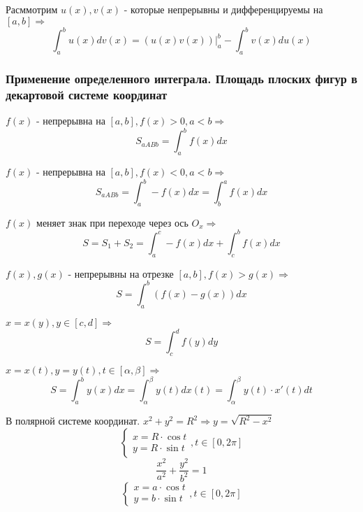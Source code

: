     \begin{theorem}
        Расммотрим $u(x), v(x)$ - которые непрерывны и дифференцируемы на $[a,b] \Rightarrow $ $$\int^b_a u(x)dv(x) = (u(x) v(x))|^b_a - \int^b_a v(x)du(x)$$
    \end{theorem}

    \subsubsection{Применение определенного интеграла. Площадь плоских фигур в декартовой системе координат}


    $f(x)$ - непрерывна на $[a,b], f(x) > 0, a<b \Rightarrow$
    $$S_{aABb} = \int^b_a f(x) dx$$


    $f(x)$ - непрерывна на $[a,b], f(x) < 0, a<b \Rightarrow$
    $$S_{aABb} = \int^b_a -f(x) dx = \int^a_b f(x)dx$$ 

    
    $f(x)$ меняет знак при переходе через ось $O_x \Rightarrow$
    $$S = S_1 + S_2 = \int_a^c - f(x)dx + \int^b_c f(x)dx$$


    $f(x), g(x)$ - непрерывны на отрезке $[a,b], f(x) > g(x) \Rightarrow$
    $$S = \int^b_a (f(x) - g(x))dx$$


    $x = x(y), y\in[c,d] \Rightarrow$
    $$S = \int_c^d f(y)dy$$


    $x=x(t), y=y(t), t\in[\alpha, \beta] \Rightarrow$
    $$S = \int^b_a y(x)dx = \int^{\beta}_{\alpha} y(t)dx(t) = \int^{\beta}_{\alpha} y(t)\cdot x'(t)dt$$


    В полярной системе координат. $x^2 + y^2 = R^2 \Rightarrow y = \sqrt{R^2 - x^2}$ 
    \begin{equation*}
    \begin{cases}
        x = R \cdot \cos t \\ 
        y = R \cdot \sin t
    \end{cases}, t \in [0, 2\pi]
    \end{equation*}
    $$\frac{x^2}{a^2} + \frac{y^2}{b^2} = 1$$
    \begin{equation*}
        \begin{cases}
            x = a \cdot \cos t \\ 
            y = b \cdot \sin t
        \end{cases}, t \in [0, 2\pi]
        \end{equation*}

